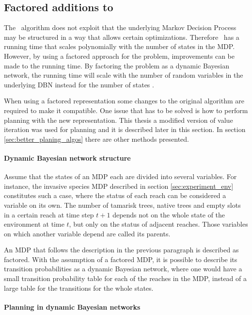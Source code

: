 \subsection{Factored additions to \etre}
\label{sec:factored_e3}

The \etre\ algorithm does not exploit that the underlying Markov Decision Process may be structured in a way that allows certain optimizations. Therefore \etre\ has a running time that scales polynomially with the number of states in the MDP. However, by using a factored approach for the problem, improvements can be made to the running time. By factoring the problem as a dynamic Bayesian network, the running time will scale with the number of random variables in the underlying DBN instead for the number of states \parencite{kearns1999efficient}. 

When using a factored representation some changes to the original algorithm are required to make it compatible. One issue that has to be solved is how to perform  planning with the new representation. This thesis a modified version of value iteration was used for planning and it is described later in this section. In section \ref{sec:better_planing_algos} there are other methods presented.

\paragraph{Dynamic Bayesian network structure}

Assume that the states of an MDP each are divided into several variables. For
instance, the invasive species MDP described in section
\ref{sec:experiment_env} constitutes such a case, where the status of each
reach can be considered a variable on its own. The number of tamarisk trees,
native trees and empty slots in a certain reach at time step $t+1$ depends not
on the whole state of the environment at time $t$, but only on the status of
adjacent reaches. Those variables on which another variable depend are called
its parents.  

An MDP that follows the description in the previous paragraph is described as
factored. With the assumption of a factored MDP, it is possible to describe its
transition probabilities as a dynamic Bayesian network, where one would have a
small transition probability table for each of the reaches in the MDP, instead
of a large table for the transitions for the whole states.

\paragraph{Planning in dynamic Bayesian networks}

